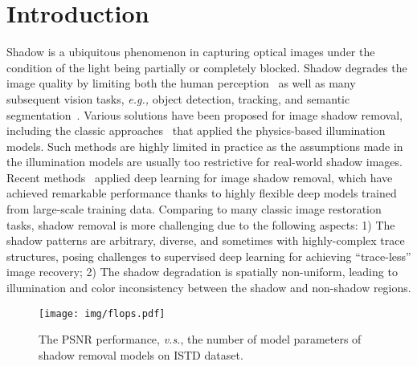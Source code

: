 \documentclass[letterpaper]{article} \usepackage{aaai23}  \usepackage{times}  \usepackage{helvet}  \usepackage{courier}  \usepackage[hyphens]{url}  \usepackage{graphicx} \urlstyle{rm} \def\UrlFont{\rm}  \usepackage{natbib}  \usepackage{caption} \frenchspacing  \setlength{\pdfpagewidth}{8.5in} \setlength{\pdfpageheight}{11in} \usepackage{algorithm}
\newcommand{\eg}{\textit{e.g., }}
\begin{document}
\section{Introduction}
Shadow is a ubiquitous phenomenon in capturing optical images under the condition of the light being partially or completely blocked. 
Shadow degrades the image quality by limiting both the human perception~\cite{cucchiara2003detecting,nadimi2004physical} as well as many subsequent vision tasks, \eg object detection, tracking, and semantic segmentation~\cite{jung2009efficient,sanin2010improved,zhang2018improving}.
Various solutions have been proposed for image shadow removal, including the classic approaches~\cite{gryka2015learning,zhang2015shadow,xiao2013fast} that applied the physics-based illumination models. Such methods are highly limited in practice as the assumptions made in the illumination models are usually too restrictive for real-world shadow images.
Recent methods~\cite{qu2017deshadownet,hu2019direction,guo2022shadowdiffusion} applied deep learning for image shadow removal, which have achieved remarkable performance thanks to highly flexible deep models trained from large-scale training data.
Comparing to many classic image restoration tasks, shadow removal is more challenging due to the following aspects: 1) The shadow patterns are arbitrary, diverse, and sometimes with highly-complex trace structures, posing challenges to supervised deep learning for achieving ``trace-less'' image recovery;
2) The shadow degradation is spatially non-uniform, leading to illumination and color inconsistency between the shadow and non-shadow regions.

\begin{figure}[!t]
\centering
\texttt{[image: img/flops.pdf]}
\vspace{-2mm}
\caption{The PSNR performance, \textit{v.s.}, the number of model parameters of shadow removal models on ISTD dataset.}
\label{fig:intro} 
\end{figure}
\end{document}
